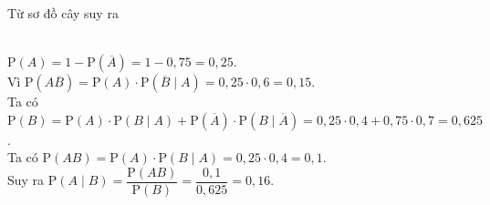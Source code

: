 \begin{ex}
{\begin{center}
		\end{center}
		Từ sơ đồ cây suy ra\\
			\begin{itemchoice}
			\\
			$\mathrm{P}\left(A\right) = 1 - \mathrm{P}\left(\overline{A}\right) = 1- 0{,}75 = 0{,}25$.
			\\
			 Vì $\mathrm{P}\left(A \overline{B}\right)
			 =\mathrm{P}\left(A\right) \cdot \mathrm{P}\left(\overline{B}\mid A\right)
			 = 0{,}25\cdot 0{,}6=0{,}15$.
			\\
			 Ta có $\mathrm{P}\left(B\right)= \mathrm{P}\left(A\right)\cdot \mathrm{P}(B\mid A)
			 + \mathrm{P}\left(\overline{A}\right)\cdot \mathrm{P}(B\mid \overline{A})
			 = 0{,}25\cdot 0{,}4 + 0{,}75\cdot 0{,}7 = 0{,}625$.
			\\
			Ta có $\mathrm{P}\left(A B\right)= \mathrm{P}\left(A\right)\cdot \mathrm{P}\left(B\mid A\right)
			=0{,}25\cdot0{,}4=0{,}1$.\\
			Suy ra $\mathrm{P}\left(A\mid B\right)= \dfrac{\mathrm{P}\left(AB\right)}{\mathrm{P}\left(B\right)}
			=\dfrac{0{,}1}{0{,}625}=0{,}16$.
		\end{itemchoice}
	}
\end{ex}
